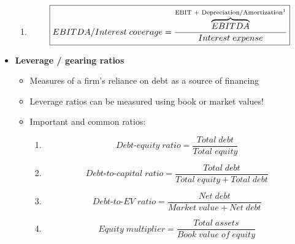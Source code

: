 \documentclass[ieeetran]{article}
\begin{document}
\begin{itemize}
\begin{enumerate}
	    \item
	    \large
	    \begin{equation*}
		    \boxed{EBITDA/Interest \; coverage = \frac{\overbrace{EBITDA}^\text{EBIT + Depreciation/Amortization\footnotemark}}{Interest \; expense}}
	\end{equation*}
	  \normalsize

 
\end{enumerate}


\item \textbf{Leverage / gearing ratios}
	\begin{itemize}
		\item Measures of a firm's reliance on debt as a source of financing
		\item Leverage ratios can be measured using book or market values!
          	\item Important and common ratios:
			\pagebreak
			\begin{enumerate}
	    			\item
	    			\large
	    			\begin{equation*}
					\boxed{Debt\text{-}equity \; ratio = \frac{Total \; debt}{Total \; equity}}
	   			\end{equation*}
	    			\normalsize 
				 
	    			\item
	    			\large
	    			\begin{equation*}
					\boxed{Debt\text{-}to\text{-}capital \; ratio = \frac{Total \; debt}{Total \; equity + Total \; debt}}
	   			\end{equation*}
	    			\normalsize

	    			\item
	    			\large
	    			\begin{equation*}
					\boxed{Debt\text{-}to\text{-}EV \; ratio = \frac{Net \; debt}{Market \; value + Net \; debt}}
	   			\end{equation*}
	    			\normalsize

	    			\item
	    			\large
	    			\begin{equation*}
					\boxed{Equity \; multiplier = \frac{Total \; assets}{Book \; value \; of \; equity}}
	   			\end{equation*}
	    			\normalsize
			\end{enumerate}
	\end{itemize}


\end{itemize}
\end{document}
